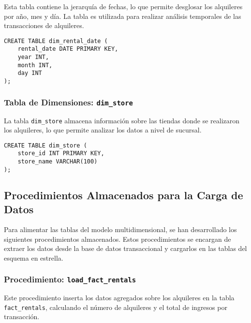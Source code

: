 \documentclass{article}
\begin{document}
Esta tabla contiene la jerarquía de fechas, lo que permite desglosar los alquileres por año, mes y día. La tabla es utilizada para realizar análisis temporales de las transacciones de alquileres.

\begin{lstlisting}
CREATE TABLE dim_rental_date (
    rental_date DATE PRIMARY KEY,
    year INT,
    month INT,
    day INT
);
\end{lstlisting}

\subsubsection{Tabla de Dimensiones: \texttt{dim\_store}}

La tabla \texttt{dim\_store} almacena información sobre las tiendas donde se realizaron los alquileres, lo que permite analizar los datos a nivel de sucursal.

\begin{lstlisting}
CREATE TABLE dim_store (
    store_id INT PRIMARY KEY,
    store_name VARCHAR(100)
);
\end{lstlisting}

\newpage
\subsection{Procedimientos Almacenados para la Carga de Datos}

Para alimentar las tablas del modelo multidimensional, se han desarrollado los siguientes procedimientos almacenados. Estos procedimientos se encargan de extraer los datos desde la base de datos transaccional y cargarlos en las tablas del esquema en estrella.

\subsubsection{Procedimiento: \texttt{load\_fact\_rentals}}

Este procedimiento inserta los datos agregados sobre los alquileres en la tabla \texttt{fact\_rentals}, calculando el número de alquileres y el total de ingresos por transacción.
\end{document}
